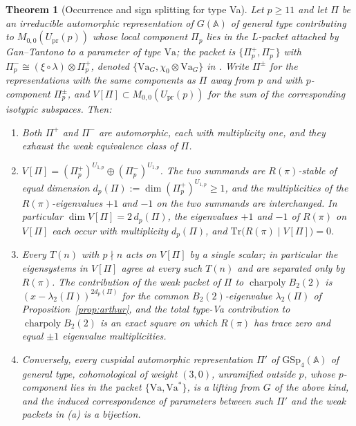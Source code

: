 \documentclass[10pt,a4paper]{amsart}
\newtheorem{theorem}{Theorem}[section]
\newcommand{\GSp}{\mathrm{GSp}}
\newcommand{\Tr}{\mathrm{Tr}}
\newcommand{\Upr}{U_{\mathrm{pr}}}
\newcommand{\Va}{\mathrm{Va}}
\DeclareMathOperator{\charp}{charpoly}
\providecommand{\Upr}{U_{\mathrm{pr}}}
\providecommand{\Va}{\mathrm{Va}}
\providecommand{\charp}{\operatorname{charpoly}}
\begin{document}
	\begin{theorem}[Occurrence and sign splitting for type Va]
		\label{thm:occurrence}
		Let $p\ge11$ and let $\Pi$ be an irreducible automorphic
		representation of $G(\mathbb{A})$ of general type contributing to
		$M_{0,0}(\Upr(p))$ whose local component $\Pi_p$ lies in the
		$L$-packet attached by Gan--Tantono to a parameter of type $\Va$;
		the packet is $\{\Pi_p^+,\Pi_p^-\}$ with
		$\Pi_p^-\cong(\xi\circ\lambda)\otimes\Pi_p^+$, denoted
		$\{\Va_G,\chi_0\otimes\Va_G\}$ in
		\cite[Table~3]{RoesnerWeissauer2021}. Write $\Pi^{\pm}$ for the
		representations with the same components as $\Pi$ away from $p$ and
		with $p$-component $\Pi_p^{\pm}$, and
		$V[\Pi]\subset M_{0,0}(\Upr(p))$ for the sum of the corresponding
		isotypic subspaces. Then:
		\begin{enumerate}[label=\textup{(\alph*)},leftmargin=2.3em]
			\item Both $\Pi^+$ and $\Pi^-$ are automorphic, each with
			multiplicity one, and they exhaust the weak equivalence class of
			$\Pi$.
			\item $V[\Pi]=(\Pi_p^+)^{U_{1,p}}\oplus(\Pi_p^-)^{U_{1,p}}$. The
			two summands are $R(\pi)$-stable of equal dimension
			$d_p(\Pi):=\dim(\Pi_p^+)^{U_{1,p}}\ge1$, and the multiplicities
			of the $R(\pi)$-eigenvalues $+1$ and $-1$ on the two summands
			are interchanged. In particular $\dim V[\Pi]=2\,d_p(\Pi)$, the
			eigenvalues $+1$ and $-1$ of $R(\pi)$ on $V[\Pi]$ each occur
			with multiplicity $d_p(\Pi)$, and
			$\Tr\bigl(R(\pi)\mid V[\Pi]\bigr)=0$.
			\item Every $T(n)$ with $p\nmid n$ acts on $V[\Pi]$ by a single
			scalar; in particular the eigensystems in $V[\Pi]$ agree at
			every such $T(n)$ and are separated only by $R(\pi)$. The
			contribution of the weak packet of $\Pi$ to $\charp B_2(2)$ is
			$(x-\lambda_2(\Pi))^{2d_p(\Pi)}$ for the common
			$B_2(2)$-eigenvalue $\lambda_2(\Pi)$ of
			Proposition~\ref{prop:arthur}, and the total type-Va
			contribution to $\charp B_2(2)$ is an exact square on which
			$R(\pi)$ has trace zero and equal $\pm1$ eigenvalue
			multiplicities.
			\item Conversely, every cuspidal automorphic representation
			$\Pi'$ of $\GSp_4(\mathbb{A})$ of general type, cohomological of
			weight $(3,0)$, unramified outside $p$, whose $p$-component lies
			in the packet $\{\Va,\Va^{*}\}$, is a lifting from $G$ of the
			above kind, and the induced correspondence of parameters between
			such $\Pi'$ and the weak packets in \textup{(a)} is a bijection.
		\end{enumerate}
	\end{theorem}
\end{document}
